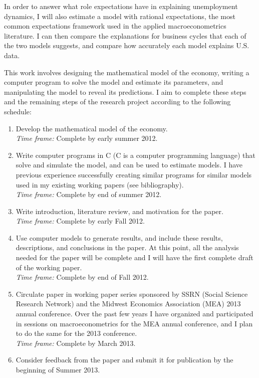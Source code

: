 \documentclass[11pt]{article}
\newcommand{\be}{
  \begin{enumerate}
  \setlength{\itemsep}{0pt}
  \setlength{\parskip}{0pt}
}
\newcommand{\ee}{\end{enumerate}}
\begin{document}
In order to answer what role expectations have in explaining unemployment dynamics, I will also estimate a model with rational expectations, the most common expectations framework used in the applied macroeconometrics literature.  I can then compare the explanations for business cycles that each of the two models suggests, and compare how accurately each model explains U.S. data.

This work involves designing the mathematical model of the economy, writing a computer program to solve the model and estimate its parameters, and manipulating the model to reveal its predictions.  I aim to complete these steps and the remaining steps of the research project according to the following schedule:

\be
\item Develop the mathematical model of the economy. \\
\textit{Time frame:} Complete by early summer 2012.
\item Write computer programs in C (C is a computer programming language) that solve and simulate the model, and can be used to estimate models.  I have previous experience successfully creating similar programs for similar models used in my existing working papers (see bibliography).\\
\textit{Time frame:} Complete by end of summer 2012.
\item Write introduction, literature review, and motivation for the paper.\\
\textit{Time frame:} Complete by early Fall 2012.
\item Use computer models to generate results, and include these results, descriptions, and conclusions in the paper.  At this point, all the analysis needed for the paper will be complete and I will have the first complete draft of the working paper.\\
\textit{Time frame:} Complete by end of Fall 2012. 
\item Circulate paper in working paper series sponsored by SSRN (Social Science Research Network) and the Midwest Economics Association (MEA) 2013 annual conference.  Over the past few years I have organized and participated in sessions on macroeconometrics for the MEA annual conference, and I plan to do the same for the 2013 conference.  \\
\textit{Time frame:} Complete by March 2013.
\item Consider feedback from the paper and submit it for publication by the beginning of Summer 2013.
\ee
\end{document}
